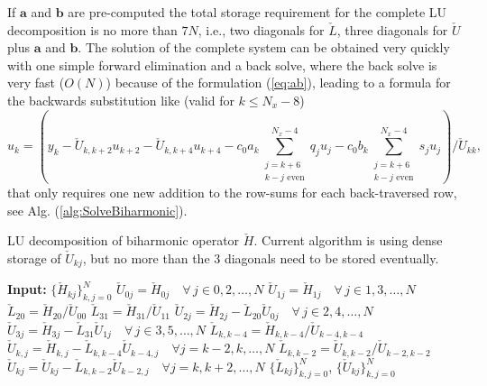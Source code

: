 \documentclass[11pt, oneside]{article}
\newcommand{\N}[1]{\check{#1}}
\begin{document}
If $\bm{a}$ and $\bm{b}$ 
are pre-computed 
the total storage requirement for the complete LU decomposition is no more than 
$7N$, i.e., two diagonals for $\N{L}$, three diagonals for $\N{U}$ plus 
$\bm{a}$ and 
$\bm{b}$. The solution of the complete system can be obtained very quickly with 
one simple forward elimination and a back solve, where the back 
solve is very fast ($O(N)$) because of the formulation (\ref{eq:ab}), leading 
to a formula for the backwards substitution like (valid for $k \le N_x-8$)
\begin{equation}
u_k = \left(y_k - \N{U}_{k, k+2} u_{k+2} - \N{U}_{k, k+4} u_{k+4} - 
c_0 a_k\sum_{\substack{j=k+6\\k-j \text{ even}}}^{N_x-4} q_j u_j - 
c_0 b_k\sum_{\substack{j=k+6\\k-j \text{ even}}}^{N_x-4} 
s_j u_j\right)/\N{U}_{kk},
\end{equation}
that only requires 
one new addition to the row-sums for each back-traversed
row, see Alg. (\ref{alg:SolveBiharmonic}).

\begin{algorithm}
	\caption{LU decomposition of biharmonic operator $\N{H}$. Current algorithm 
	is using dense storage of $\N{U}_{kj}$, but no more than the 3 diagonals 
	need 
	to be stored eventually.}
	\label{alg:lu_biharmonic}
	\begin{algorithmic}[1]
			\State \textbf{Input:} $\{\N{H}_{kj}\}_{k, j = 0}^{N}$
	        \State $\N{U}_{0j} = \N{H}_{0j} \quad \forall \, j \in 0, 2, 
	        \ldots, N$
	        \State $\N{U}_{1j} = \N{H}_{1j} \quad \forall \, j \in 1, 3, 
	        \ldots, N$
	        \State $\N{L}_{20} = \N{H}_{20}/\N{U}_{00}$
	        \State $\N{L}_{31} = \N{H}_{31}/\N{U}_{11}$
	        \State $\N{U}_{2j} = \N{H}_{2j} - \N{L}_{20} \N{U}_{0j} \quad 
	        \forall \, j \in 2, 4, \ldots, N$
	        \State $\N{U}_{3j} = \N{H}_{3j} - \N{L}_{31} \N{U}_{1j} \quad 
	        \forall \, j \in 
	        3, 5, \ldots, N$
		        \State $\N{L}_{k,k-4} = \N{H}_{k, k-4} / \N{U}_{k-4, k-4}$
		        \State $\N{U}_{k,j} = \N{H}_{k,j} - \N{L}_{k, k-4} 
		        \N{U}_{k-4, j} 
		        \quad \forall j = k-2, k, \ldots, N$
	            \State $\N{L}_{k,k-2} = {\N{U}}_{k,k-2}/{\N{U}}_{k-2, k-2}$
		        \State $\N{U}_{kj} = {\N{U}}_{kj} - \N{L}_{k, k-2} \N{U}_{k-2, 
		        j} \quad 
		        \forall j = k, k+2, \ldots, N$
	        \EndFor
	        \State \Return $\{\N{L}_{kj}\}_{k, j = 0}^{N}$, $\{\N{U}_{kj}\}_{k, 
	        j = 
	        0}^{N}$
		\EndProcedure	
	\end{algorithmic}
\end{algorithm}		
\end{document}
